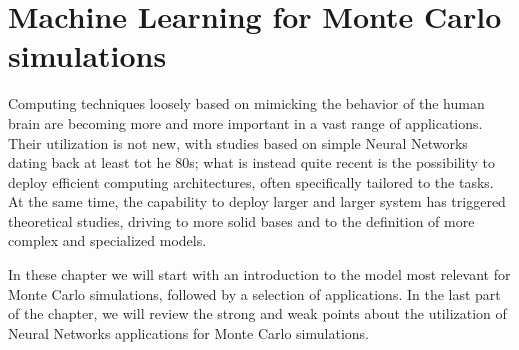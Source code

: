 \chapter{Machine Learning for Monte Carlo simulations}
Computing techniques loosely based on mimicking the behavior of the human brain are becoming more and more important in a vast range of applications.
Their utilization is not new, with studies based on simple Neural Networks~\cite{nn1,nn2,nn3} dating back at least tot he 80s; what is instead quite recent is the possibility to deploy efficient computing architectures, often specifically tailored to the tasks.
At the same time, the capability to deploy larger and larger system has triggered theoretical studies, driving to more solid bases and to  the definition of more complex and specialized models.

In these chapter we will start with an introduction to the model most relevant for Monte Carlo simulations, followed by a selection of applications. In the last part of the chapter, we will review the strong and weak points about the utilization of Neural Networks applications for Monte Carlo simulations.
